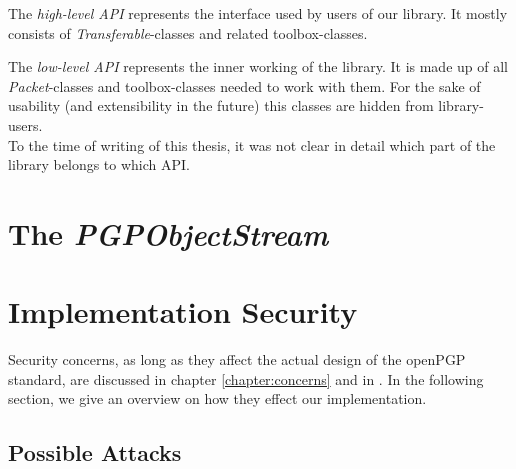 The \textit{high-level API} represents the interface used by users of our library. It mostly consists of \textit{Transferable}-classes and related toolbox-classes.

The \textit{low-level API} represents the inner working of the library. It is made up of all \textit{Packet}-classes and toolbox-classes needed to work with them. For the sake of usability (and extensibility in the future) this classes are hidden from library-users. \\

To the time of writing of this thesis, it was not clear in detail which part of the library belongs to which API. 

\section{The \textit{PGPObjectStream}}



%
%
%
%
%
%

\section{Implementation Security}

Security concerns, as long as they affect the actual design of the openPGP standard, are discussed in chapter \ref{chapter:concerns} and in \citep[section 14]{RFC4880}. In the following section, we give an overview on how they effect our implementation. 

\subsection{Possible Attacks}










